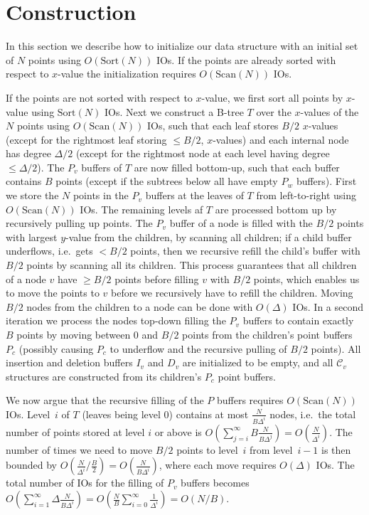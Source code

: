 \documentclass[11pt]{article}
\newcommand{\Sort}{\mathrm{Sort}}
\newcommand{\Scan}{\mathrm{Scan}}
\begin{document}
\section{Construction}
\label{sec:construction}

In this section we describe how to initialize our data structure with
an initial set of $N$ points using $O(\Sort(N))$ IOs. If the points
are already sorted with respect to $x$-value the initialization
requires $O(\Scan(N))$ IOs.

If the points are not sorted with respect to $x$-value, we first sort
all points by $x$-value using $\Sort(N)$ IOs. Next we construct a
B-tree $T$ over the $x$-values of the $N$ points using $O(\Scan(N))$
IOs, such that each leaf stores $B/2$ $x$-values (except for the
rightmost leaf storing $\leq B/2$, $x$-values) and each internal node
has degree $\Delta/2$ (except for the rightmost node at each level
having degree $\leq\Delta/2$). The $P_v$ buffers of $T$ are now filled
bottom-up, such that each buffer contains $B$ points (except if the
subtrees below all have empty $P_w$ buffers). First we store the $N$
points in the $P_v$ buffers at the leaves of $T$ from left-to-right
using $O(\Scan(N))$ IOs. The remaining levels af $T$ are processed
bottom up by recursively pulling up points. The $P_v$ buffer of a node
is filled with the $B/2$ points with largest $y$-value from the
children, by scanning all children; if a child buffer underflows,
i.e.\ gets $< B/2$ points, then we recursive refill the child's buffer
with $B/2$ points by scanning all its children. This process
guarantees that all children of a node $v$ have $\geq B/2$ points
before filling $v$ with $B/2$ points, which enables us to move the
points to $v$ before we recursively have to refill the
children. Moving $B/2$ nodes from the children to a node can be done
with $O(\Delta)$ IOs.  In a second iteration we process the nodes
top-down filling the $P_v$ buffers to contain exactly $B$ points by
moving between 0 and $B/2$ points from the children's point buffers
$P_c$ (possibly causing $P_c$ to underflow and the recursive pulling
of $B/2$ points).  All insertion and deletion buffers $I_v$ and $D_v$
are initialized to be empty, and all $\mathcal{C}_v$ structures are
constructed from its children's $P_c$ point buffers.

We now argue that the recursive filling of the $P$ buffers requires
$O(\Scan(N))$ IOs. Level~$i$ of $T$ (leaves being level 0) contains at
most $\frac{N}{B\Delta^i}$ nodes, i.e.\ the total number of points
stored at level $i$ or above is $O(\sum_{j=i}^{\infty}
B\frac{N}{B\Delta^j})=O(\frac{N}{\Delta^i})$. The number of times we
need to move $B/2$ points to level~$i$ from level~$i-1$ is then
bounded by $O(\frac{N}{\Delta^i}/\frac{B}{2})=O(\frac{N}{B\Delta^i})$,
where each move requires $O(\Delta)$ IOs. The total number of IOs for
the filling of $P_v$ buffers becomes $O(\sum_{i=1}^{\infty}
\Delta\frac{N}{B\Delta^i}) = O(\frac{N}{B} \sum_{i=0}^{\infty}
\frac{1}{\Delta^i})=O(N/B)$.
\end{document}

